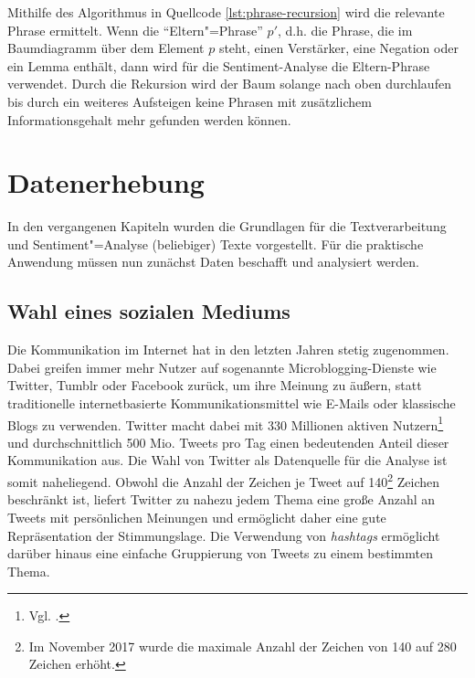 \documentclass[
	a4paper,
	12pt,
	bibliography=totocnumbered,
	twoside,
]{scrreprt}
\begin{document}
Mithilfe des Algorithmus in Quellcode \ref{lst:phrase-recursion} wird die relevante Phrase ermittelt. Wenn die "`Eltern"=Phrase"' $p'$, d.h. die Phrase, die im Baumdiagramm über dem Element $p$ steht, einen Verstärker, eine Negation oder ein Lemma enthält, dann wird für die Sentiment-Analyse die Eltern-Phrase verwendet. Durch die Rekursion wird der Baum solange nach oben durchlaufen bis durch ein weiteres Aufsteigen keine Phrasen mit zusätzlichem Informationsgehalt mehr gefunden werden können.\\

\section{Datenerhebung}
\label{sec:datenerhebnug}

In den vergangenen Kapiteln wurden die Grundlagen für die Textverarbeitung und Sen\-ti\-ment"=Analy\-se (beliebiger) Texte vorgestellt. Für die praktische Anwendung müssen nun zunächst Daten beschafft und analysiert werden.

\subsection*{Wahl eines sozialen Mediums}
Die Kommunikation im Internet hat in den letzten Jahren stetig zugenommen. Dabei greifen immer mehr Nutzer auf sogenannte Microblogging-Dienste wie Twitter, Tumblr oder Facebook zurück, um ihre Meinung zu äußern, statt traditionelle internetbasierte Kommunikationsmittel wie E-Mails oder klassische Blogs zu verwenden. Twitter macht dabei mit 330 Millionen aktiven Nutzern\footnote{Vgl. \citet{statista2019}.} und durchschnittlich 500 Mio. Tweets pro Tag einen bedeutenden Anteil dieser Kommunikation aus. Die Wahl von Twitter als Datenquelle für die Analyse ist somit naheliegend. Obwohl die Anzahl der Zeichen je Tweet auf 140\footnote{Im November 2017 wurde die maximale Anzahl der Zeichen von 140 auf 280 Zeichen erhöht.} Zeichen beschränkt ist, liefert Twitter zu nahezu jedem Thema eine große Anzahl an Tweets mit persönlichen Meinungen und ermöglicht daher eine gute Repräsentation der Stimmungslage. Die Verwendung von \textit{hashtags} ermöglicht darüber hinaus eine einfache Gruppierung von Tweets zu einem bestimmten Thema.



\end{document}

